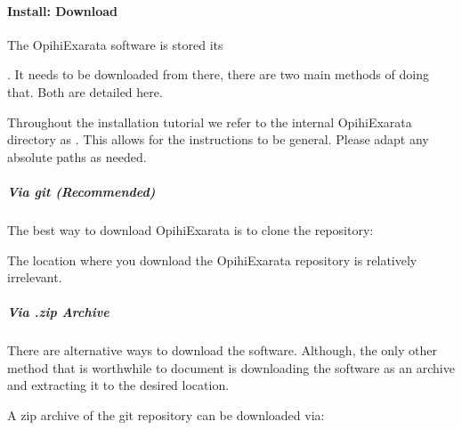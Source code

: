\documentclass[letterpaper,11pt,english]{sphinxmanual}
\begin{document}
\sphinxstepscope


\paragraph{Install: Download}
\label{\detokenize{technical/installation/download:install-download}}\label{\detokenize{technical/installation/download:technical-installation-download}}\label{\detokenize{technical/installation/download::doc}}
\sphinxAtStartPar
The OpihiExarata software is stored its
%
\begin{footnote}[27]\sphinxAtStartFootnote
{}
%
\end{footnote}.
It needs to be downloaded from there, there are two main methods of doing that.
Both are detailed here.

\sphinxAtStartPar
Throughout the installation tutorial we refer to the internal OpihiExarata
directory as . This allows for the instructions to be
general. Please adapt any absolute paths as needed.


\subparagraph{Via git (Recommended)}
\label{\detokenize{technical/installation/download:via-git-recommended}}
\sphinxAtStartPar
The best way to download OpihiExarata is to clone the repository:

\begin{sphinxVerbatim}[commandchars=\\\{\}]
  
\end{sphinxVerbatim}

\sphinxAtStartPar
The location where you download the OpihiExarata repository is relatively
irrelevant.


\subparagraph{Via .zip Archive}
\label{\detokenize{technical/installation/download:via-zip-archive}}
\sphinxAtStartPar
There are alternative ways to download the software. Although, the only other
method that is worthwhile to document is downloading the software as an
archive and extracting it to the desired location.

\sphinxAtStartPar
A zip archive of the git repository can be downloaded via:
\end{document}

